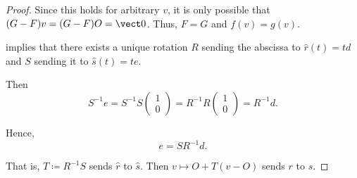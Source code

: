 \begin{proof}
  Since this holds for arbitrary \( v \), it is only possible that \( (G - F) v = (G - F) O = \vect 0 \). Thus, \( F = G \) and \( f(v) = g(v) \).

  \ExistenceSubProof {} implies that there exists a unique rotation \( R \) sending the abscissa to \( \widehat{r}(t) = td \) and \( S \) sending it to \( \widehat{s}(t) = te \).

  Then
  \begin{equation*}
    S^{-1} e
    =
    S^{-1} S \begin{pmatrix} 1 \\ 0 \end{pmatrix}
    =
    R^{-1} R \begin{pmatrix} 1 \\ 0 \end{pmatrix}
    =
    R^{-1} d.
  \end{equation*}

  Hence,
  \begin{equation*}
    e = S R^{-1} d.
  \end{equation*}

  That is, \( T \coloneqq R^{-1} S \) sends \( \widehat{r} \) to \( \widehat{s} \). Then \( v \mapsto O + T(v - O) \) sends \( r \) to \( s \).
\end{proof}

